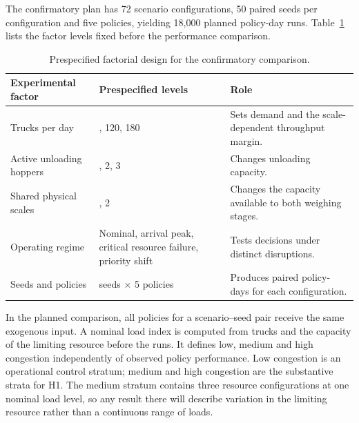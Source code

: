 \documentclass[12pt,a4paper]{article}
\begin{document}
The confirmatory plan has 72 scenario configurations, 50 paired seeds per configuration and five policies, yielding 18,000 planned policy-day runs. Table~\ref{tab:factorial-design} lists the factor levels fixed before the performance comparison.

\begin{table}[htbp]
\centering
\small

\begin{tabularx}{\textwidth}{@{}>{\raggedright\arraybackslash}p{}>{\raggedright\arraybackslash}p{}>{\raggedright\arraybackslash}X@{}}
\toprule

Experimental factor & Prespecified levels & Role \\

\midrule

Trucks per day & 60, 120, 180 & Sets demand and the scale-dependent throughput margin. \\

Active unloading hoppers & 1, 2, 3 & Changes unloading capacity. \\

Shared physical scales & 1, 2 & Changes the capacity available to both weighing stages. \\

Operating regime & Nominal, arrival peak, critical resource failure, priority shift & Tests decisions under distinct disruptions. \\

Seeds and policies & 50 seeds × 5 policies & Produces paired policy-days for each configuration. \\

\bottomrule
\end{tabularx}

\caption{Prespecified factorial design for the confirmatory comparison.}

\label{tab:factorial-design}
\end{table}

In the planned comparison, all policies for a scenario–seed pair receive the same exogenous input. A nominal load index is computed from trucks and the capacity of the limiting resource before the runs. It defines low, medium and high congestion independently of observed policy performance. Low congestion is an operational control stratum; medium and high congestion are the substantive strata for H1. The medium stratum contains three resource configurations at one nominal load level, so any result there will describe variation in the limiting resource rather than a continuous range of loads.
\end{document}
